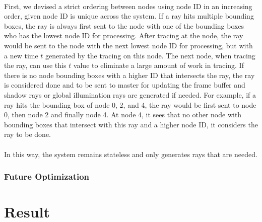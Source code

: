 \documentclass[a4paper, oneside, 10pt]{article}
\begin{document}
\paragraph{} First, we devised a strict ordering between nodes using node ID in an increasing order, given node ID is unique across the system. If a ray hits multiple bounding boxes, the ray is always first sent to the node with one of the bounding boxes who has the lowest node ID for processing.  After tracing at the node, the ray would be sent to the node with the next lowest node ID for processing, but with a new time $t$ generated by the tracing on this node. The next node, when tracing the ray, can use this $t$ value to eliminate a large amount of work in tracing. If there is no node bounding boxes with a higher ID that intersects the ray, the ray is considered done and to be sent to master for updating the frame buffer and shadow rays or global illumination rays are generated if needed.  For example, if a ray hits the bounding box of node 0, 2, and 4, the ray would be first sent to node 0, then node 2 and finally node 4. At node 4, it sees that no other node with bounding boxes that intersect with this ray and a higher node ID, it considers the ray to be done.
\paragraph{} In this way, the system remains stateless and only generates rays that are needed. 

\subsubsection{Future Optimization}
\section{Result}





\end{document}
